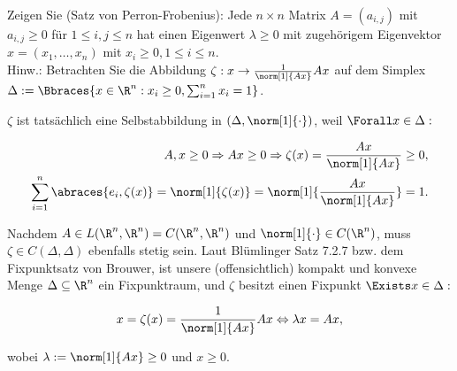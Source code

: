 \begin{exercise}

Zeigen Sie (Satz von Perron-Frobenius): Jede $n\times n$ Matrix $A = (a_{i,j})$ mit $a_{i,j} \geq 0$ für $1 \leq i, j \leq n$ hat einen Eigenwert $\lambda \geq 0$ mit zugehörigem Eigenvektor $x = (x_1,\dots,x_n)$ mit $x_i \geq 0, 1 \leq i \leq n$. \\

Hinw.: Betrachten Sie die Abbildung $\zeta: x \to \frac{1}{\norm[1]{Ax}} Ax$ auf dem Simplex $\Delta := \Bbraces{x \in \R^n: x_i \geq 0, \sum_{i=1}^n x_i = 1}$.

\end{exercise}

\begin{solution}

$\zeta$ ist tatsächlich eine Selbstabbildung in $(\Delta, \norm[1]{\cdot})$, weil $\Forall x \in \Delta:$

\begin{align*}
  A, x \geq 0
  \Rightarrow
  Ax \geq 0
  \Rightarrow
  \zeta(x) = \frac{Ax}{\norm[1]{Ax}} \geq 0, \\
  \sum_{i=1}^n \abraces{e_i, \zeta(x)}
  = \norm[1]{\zeta(x)}
  = \norm[1]{\frac{Ax}{\norm[1]{Ax}}}
  = 1.
\end{align*}

Nachdem $A \in L(\R^n, \R^n) = C(\R^n, \R^n)$ und $\norm[1]{\cdot} \in C(\R^n)$, muss $\zeta \in C(\Delta, \Delta)$ ebenfalls stetig sein. Laut Blümlinger Satz 7.2.7 bzw. dem Fixpunktsatz von Brouwer, ist unsere (offensichtlich) kompakt und konvexe Menge $\Delta \subseteq \R^n$ ein Fixpunktraum, und $\zeta$ besitzt einen Fixpunkt $\Exists x \in \Delta:$

\begin{equation*}
  x = \zeta(x) = \frac{1}{\norm[1]{Ax}} Ax
  \Leftrightarrow
  \lambda x = Ax,
\end{equation*}

wobei $\lambda := \norm[1]{Ax} \geq 0$ und $x \geq 0$.

\end{solution}
